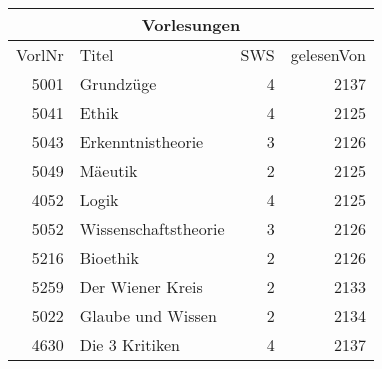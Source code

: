 {
\begin{tabular}[t]{|r|l|r|r|}
  \hline
  \multicolumn{4}{|c|}{Vorlesungen}\\
  \hline
  VorlNr & Titel & SWS & gelesenVon\\
  \hline\hline
  5001 & Grundzüge & 4 & 2137\\
  5041 & Ethik & 4 & 2125\\
  5043 & Erkenntnistheorie & 3 & 2126\\
  5049 & Mäeutik & 2 & 2125\\
  4052 & Logik & 4 & 2125\\
  5052 & Wissenschaftstheorie & 3 & 2126\\
  5216 & Bioethik & 2 & 2126\\
  5259 & Der Wiener Kreis & 2 & 2133\\
  5022 & Glaube und Wissen & 2 & 2134\\
  4630 & Die 3 Kritiken & 4 & 2137\\
  \hline
\end{tabular}}
